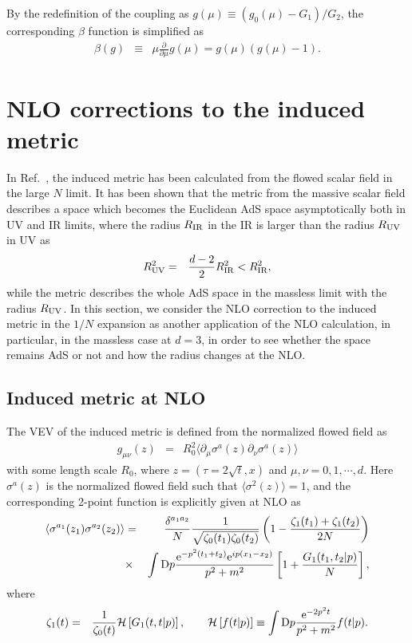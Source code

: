 \documentclass[preprint]{ptephy_v1}%
\newcommand{\rme}{{\rm e}}
\newcommand{\rmD}{{\rm D}}
\begin{document}
By the redefinition of the coupling as $g(\mu) \equiv ( g_0(\mu) - G_1 )/G_2$, the corresponding $\beta$ function is simplified as
\begin{eqnarray}
\beta (g) &\equiv&\mu \frac{\partial }{\partial \mu} g(\mu) = g(\mu) (g(\mu) - 1) .
\end{eqnarray}
 
\section{NLO corrections to the induced metric}
\label{sec:metric}


In Ref.~\cite{Aoki:2016ohw}, the induced metric has been calculated from the flowed scalar field in the large $N$ limit.
It has been shown that the metric from the massive scalar field describes a space which becomes  the Euclidean AdS space asymptotically both in UV and IR limits, where the radius $R_{\rm IR}$ in the IR is larger than the radius $R_{\rm UV}$ in UV as
\begin{eqnarray}
R_{\rm UV}^2 &=&\frac{d-2}{2} R_{\rm IR}^2 < R_{\rm IR}^2,
\end{eqnarray}
while the metric describes the whole AdS space in the massless limit with the radius $R_{\rm UV}$.
In this section, we consider the NLO correction to the induced metric in the $1/N$ expansion
as another application of the NLO calculation,
in particular, in the massless case at $d=3$, in order to see whether the space remains AdS or not and how the radius changes at the NLO. 

\subsection{Induced metric at NLO}
The VEV of  the induced metric is defined from the normalized flowed field as\cite{Aoki:2016ohw}
\begin{eqnarray}
g_{\mu\nu} (z) &=& R_0^2 \langle \partial_\mu \sigma^a (z) \partial_\nu \sigma^a (z) \rangle 
\end{eqnarray}
with some length scale $R_0$, where $z=(\tau=2\sqrt{t}, x)$ and $\mu,\nu =0,1,\cdots, d$.
Here $\sigma^a(z)$ is the normalized flowed field such that $\langle \sigma^2(z) \rangle =1$, and the corresponding 2-point function is explicitly given at NLO as
\begin{eqnarray}
\langle \sigma^{a_1}(z_1)  \sigma^{a_2}(z_2) \rangle &=& \frac{\delta^{a_1a_2}}{N}\frac{1}{\sqrt{\zeta_0(t_1)\zeta_0(t_2)}}\left( 1-\dfrac{\zeta_1(t_1)+\zeta_1(t_2)}{2N}\right) \nonumber \\
&\times&
\int \rmD p \frac{\rme^{-p^2(t_1+t_2)}\rme^{i p(x_1-x_2)}}{p^2+m^2} \left[1 +\frac{G_1(t_1,t_2\vert p)}{N} \right],
\end{eqnarray}
where
\begin{eqnarray}
\zeta_1(t) &=& \frac{1}{\zeta_0(t)} {\cal H}\left[ G_1(t,t\vert p) \right] , \qquad  {\cal H}\left[ f(t\vert p) \right]\equiv\int \rmD p \frac{\rme^{-2p^2t} }{p^2+m^2} f(t\vert p) . 
\label{eq:def_H}
\end{eqnarray}
\end{document}
